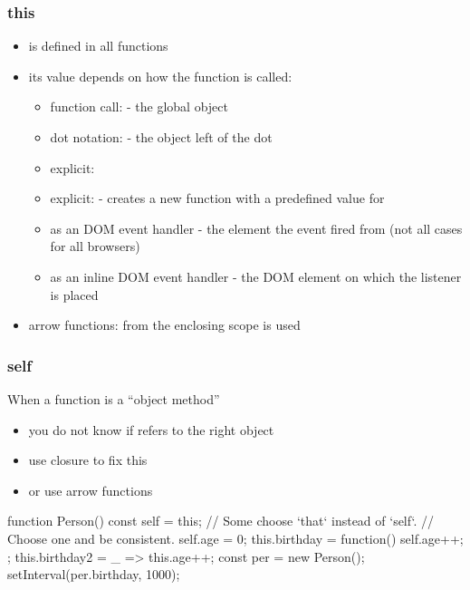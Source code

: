 \begin{frame}[fragile] \frametitle{this}
\begin{itemize}
  \item {} is defined in all functions
  \item its value depends on how the function is called:
  \begin{itemize}
    \item function call:  - the global object
    \item dot notation:  - the object left of the dot
    \item explicit: 
    \item explicit:  - creates a new function with a predefined value for 
    \item as an DOM event handler - the element the event fired from (not all cases for all browsers)
    \item as an inline DOM event handler - the DOM element on which the listener is placed
  \end{itemize}
  \item arrow functions:  from the enclosing scope is used
\end{itemize}
\end{frame}

\begin{frame}[fragile] \frametitle{self}
When a function is a ``object method''
\begin{itemize}
  \item you do not know if  refers to the right object
  \item use closure to fix this
  \item or use arrow functions
\end{itemize}
\begin{CodeBox}{}
function Person() {
  const self = this; // Some choose `that` instead of `self`. 
                           // Choose one and be consistent.
  self.age = 0;
  this.birthday = function() { self.age++; };
  this.birthday2 = _ =>  this.age++;
}
const per = new Person();
setInterval(per.birthday, 1000);
\end{CodeBox}
\end{frame}

